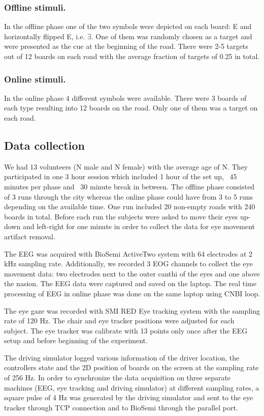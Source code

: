\documentclass[12pt]{iopart}
\begin{document}
\subsubsection*{Offline stimuli.}
In the offline phase one of the two symbols were depicted on each board:
E and horizontally flipped E, i.e. $\exists$.
One of them was randomly chosen as a target and were presented as the cue
at the beginning of the road. There were 2-5 targets out of 12 boards
on each road with the average fraction of targets of 0.25 in total.

\subsubsection*{Online stimuli.}
In the online phase 4 different symbols were available. There were
3 boards of each type resulting into 12 boards on the road.
Only one of them was a target on each road.


\subsection{Data collection}
We had 13 volunteers (N male and N female) with the average age of N.
They participated in one 3 hour session which included
1 hour of the set up, ~45 minutes per phase and ~30 minute break in between.
The offline phase consisted of 3 runs through the city  whereas the online
phase could have from 3 to 5 runs depending on the available time.
One run included 20 non-empty roads with 240 boards in total.
Before each run the subjects were asked to move their eyes up-down and left-right
for one minute in order to collect the data for eye movement artifact removal.

The EEG was acquired with BioSemi ActiveTwo system with 64 electrodes at 2 kHz sampling rate.
Additionally, we recorded 3 EOG channels to collect the eye movement data:
two electrodes next to the outer canthi of the eyes and one above the nasion.
The EEG data were captured and saved on the laptop. The real time processing
of EEG in online phase was done on the same laptop using CNBI loop.

The eye gaze was recorded with SMI RED Eye tracking system with the sampling rate of 120 Hz.
The chair and eye tracker positions were adjusted for each subject. The eye tracker
was calibrate with 13 points only once after the EEG setup and before beginning of 
the experiment.

The driving simulator logged various information of the driver location,
the controllers state and the 2D position of boards on the screen at the sampling rate
of 256 Hz. In order to synchronize the data acquisition on three separate machines
(EEG, eye tracking and driving simulator) at different sampling rates,
a square pulse of 4 Hz was generated by the driving simulator and sent 
to the eye tracker through TCP connection and to BioSemi through the parallel port.
\end{document}
